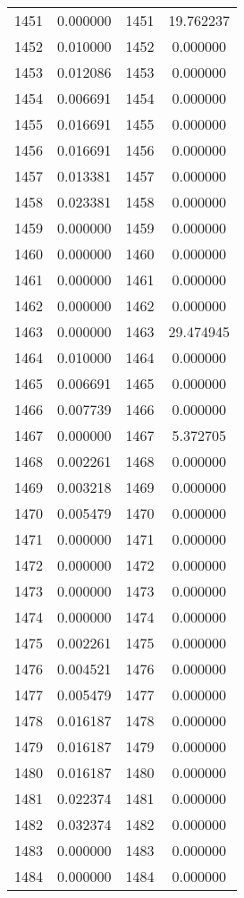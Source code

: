 \documentclass[12pt]{article}
\begin{document}
\begin{longtable}{@{}cccc@{}}
1451 & 0.000000 & 1451 & 19.762237 \\
1452 & 0.010000 & 1452 & 0.000000 \\
1453 & 0.012086 & 1453 & 0.000000 \\
1454 & 0.006691 & 1454 & 0.000000 \\
1455 & 0.016691 & 1455 & 0.000000 \\
1456 & 0.016691 & 1456 & 0.000000 \\
1457 & 0.013381 & 1457 & 0.000000 \\
1458 & 0.023381 & 1458 & 0.000000 \\
1459 & 0.000000 & 1459 & 0.000000 \\
1460 & 0.000000 & 1460 & 0.000000 \\
1461 & 0.000000 & 1461 & 0.000000 \\
1462 & 0.000000 & 1462 & 0.000000 \\
1463 & 0.000000 & 1463 & 29.474945 \\
1464 & 0.010000 & 1464 & 0.000000 \\
1465 & 0.006691 & 1465 & 0.000000 \\
1466 & 0.007739 & 1466 & 0.000000 \\
1467 & 0.000000 & 1467 & 5.372705 \\
1468 & 0.002261 & 1468 & 0.000000 \\
1469 & 0.003218 & 1469 & 0.000000 \\
1470 & 0.005479 & 1470 & 0.000000 \\
1471 & 0.000000 & 1471 & 0.000000 \\
1472 & 0.000000 & 1472 & 0.000000 \\
1473 & 0.000000 & 1473 & 0.000000 \\
1474 & 0.000000 & 1474 & 0.000000 \\
1475 & 0.002261 & 1475 & 0.000000 \\
1476 & 0.004521 & 1476 & 0.000000 \\
1477 & 0.005479 & 1477 & 0.000000 \\
1478 & 0.016187 & 1478 & 0.000000 \\
1479 & 0.016187 & 1479 & 0.000000 \\
1480 & 0.016187 & 1480 & 0.000000 \\
1481 & 0.022374 & 1481 & 0.000000 \\
1482 & 0.032374 & 1482 & 0.000000 \\
1483 & 0.000000 & 1483 & 0.000000 \\
1484 & 0.000000 & 1484 & 0.000000 \\

\end{longtable}
\end{document}
